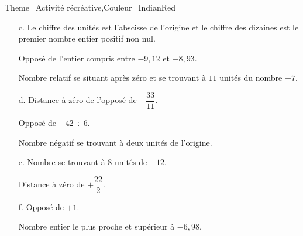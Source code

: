 \begin{Maquette}[Cours]{Theme={Activité récréative},Couleur={IndianRed}}
\begin{multicols}{2}
\begin{enumerate}
         \item[c.] Le chiffre des unités est l'abscisse de l'origine et le chiffre des dizaines est le premier nombre entier positif non nul. \par
            Opposé de l'entier compris entre $-9,12$ et $-8,93$. \par
            Nombre relatif se situant après zéro et se trouvant à $11$ unités du nombre $-7$. \par
         \item[d.] Distance à zéro de l'opposé de $-\dfrac{33}{11}$. \par
            Opposé de $-42\div6$. \par
            Nombre négatif se trouvant à deux unités de l'origine. \par
         \item[e.] Nombre se trouvant à 8 unités de $-12$. \par
            Distance à zéro de $+\dfrac{22}{2}$. \par
         \item[f.] Opposé de $+1$. \par
            Nombre entier le plus proche et supérieur à $-6,98$.
      \end{enumerate}

   \end{multicols}

\end{Maquette}
